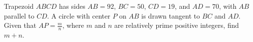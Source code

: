 Trapezoid $ABCD$ has sides $AB=92$, $BC=50$, $CD=19$, and $AD=70$, with $AB$ parallel to $CD$. A circle with center $P$ on $AB$ is drawn tangent to $BC$ and $AD$. Given that $AP=\frac mn$, where $m$ and $n$ are relatively prime positive integers, find $m+n$.